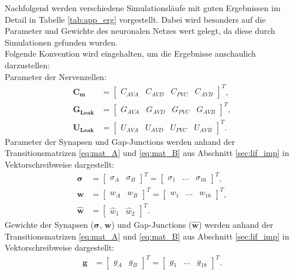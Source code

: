 	Nachfolgend werden verschiedene Simulationsläufe mit guten Ergebnissen im Detail in Tabelle \ref{tab:app_erg} vorgestellt. Dabei wird besonders auf die Parameter und Gewichte des neuronalen Netzes wert gelegt, da diese durch Simulationen gefunden wurden.\\
	Folgende Konvention wird eingehalten, um die Ergebnisse anschaulich darzustellen:\\
	Parameter der Nervenzellen:
	\begin{align}
		\boldsymbol{C_m} &= \begin{bmatrix}C_{AVA} & C_{AVD} & C_{PVC} & C_{AVB}\end{bmatrix}^T,\\
		\boldsymbol{G_{Leak}} &= \begin{bmatrix}G_{AVA} & G_{AVD} & G_{PVC} & G_{AVB}\end{bmatrix}^T,\\
		\boldsymbol{U_{Leak}} &= \begin{bmatrix}U_{AVA} & U_{AVD} & U_{PVC} & U_{AVB}\end{bmatrix}^T.
	\end{align}
	Parameter der Synapsen und Gap-Junctions  werden anhand der Transitionsmatrizen \eqref{eq:mat_A} und \eqref{eq:mat_B} aus Abschnitt \ref{sec:lif_imp} in Vektorschreibweise dargestellt:
	\begin{align}
		\boldsymbol{\sigma} &= \begin{bmatrix}\sigma_A & \sigma_B\end{bmatrix}^T = \begin{bmatrix}\sigma_1 & \dots & \sigma_{16}\end{bmatrix}^T,\\
		\boldsymbol{w} &= \begin{bmatrix}w_A & w_B\end{bmatrix}^T = \begin{bmatrix}w_1 & \dots & w_{16}\end{bmatrix}^T,\\
		\boldsymbol{\hat{w}} &= \begin{bmatrix}\hat{w}_1 & \hat{w}_{2}\end{bmatrix}^T.
	\end{align}
	Gewichte der Synapsen ($\boldsymbol{\sigma}$, $\boldsymbol{w}$) und Gap-Junctions ($\boldsymbol{\hat{w}}$) werden anhand der Transitionsmatrizen \eqref{eq:mat_A} und \ref{eq:mat_B} aus Abschnitt \ref{sec:lif_imp} in Vektorschreibweise dargestellt:
	\begin{align}
		\boldsymbol{g} &= \begin{bmatrix}g_A & g_B\end{bmatrix}^T = \begin{bmatrix}g_1 & \dots & g_{18}\end{bmatrix}^T.
	\end{align}
